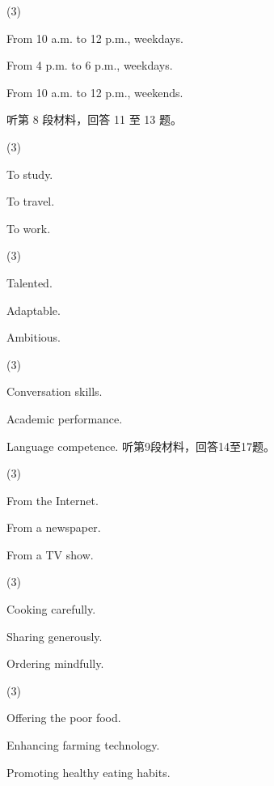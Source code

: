 \documentclass{英语试卷}
\begin{document}
\begin{choices}(3)
  \item From 10 a.m. to 12 p.m., weekdays.
  \item From 4 p.m. to 6 p.m., weekdays.
  \item From 10 a.m. to 12 p.m., weekends.
\end{choices}
\par 听第 8 段材料，回答 11 至 13 题。\par
{}
\begin{choices}(3)
  \item To study.
  \item To travel.
  \item To work.
\end{choices}
\begin{choices}(3)
  \item Talented.
  \item Adaptable.
  \item Ambitious.
\end{choices}
\begin{choices}(3)
  \item Conversation skills.
  \item Academic performance.
  \item Language competence. 听第9段材料，回答14至17题。
\end{choices}
\begin{choices}(3)
  \item From the Internet.
  \item From a newspaper.
  \item From a TV show.
\end{choices}
\begin{choices}(3)
  \item Cooking carefully.
  \item Sharing generously.
  \item Ordering mindfully.
\end{choices}
\begin{choices}(3)
  \item Offering the poor food.
  \item Enhancing farming technology.
  \item Promoting healthy eating habits.
\end{choices}
\end{document}
